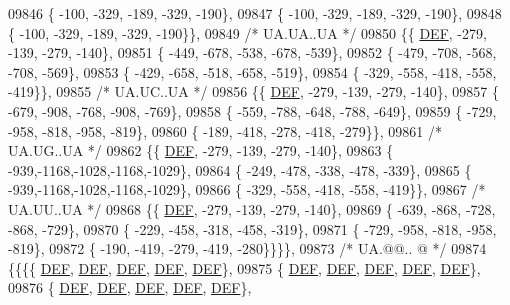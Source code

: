 \begin{DoxyCode}
09846 \{ -100, -329, -189, -329, -190\},
09847 \{ -100, -329, -189, -329, -190\},
09848 \{ -100, -329, -189, -329, -190\}\},
09849 \textcolor{comment}{/* UA.UA..UA */}
09850 \{\{  \mbox{\hyperlink{1_88_84__epars_8h_a397419fc12b37ed479c8abb9d444d843}{DEF}}, -279, -139, -279, -140\},
09851 \{ -449, -678, -538, -678, -539\},
09852 \{ -479, -708, -568, -708, -569\},
09853 \{ -429, -658, -518, -658, -519\},
09854 \{ -329, -558, -418, -558, -419\}\},
09855 \textcolor{comment}{/* UA.UC..UA */}
09856 \{\{  \mbox{\hyperlink{1_88_84__epars_8h_a397419fc12b37ed479c8abb9d444d843}{DEF}}, -279, -139, -279, -140\},
09857 \{ -679, -908, -768, -908, -769\},
09858 \{ -559, -788, -648, -788, -649\},
09859 \{ -729, -958, -818, -958, -819\},
09860 \{ -189, -418, -278, -418, -279\}\},
09861 \textcolor{comment}{/* UA.UG..UA */}
09862 \{\{  \mbox{\hyperlink{1_88_84__epars_8h_a397419fc12b37ed479c8abb9d444d843}{DEF}}, -279, -139, -279, -140\},
09863 \{ -939,-1168,-1028,-1168,-1029\},
09864 \{ -249, -478, -338, -478, -339\},
09865 \{ -939,-1168,-1028,-1168,-1029\},
09866 \{ -329, -558, -418, -558, -419\}\},
09867 \textcolor{comment}{/* UA.UU..UA */}
09868 \{\{  \mbox{\hyperlink{1_88_84__epars_8h_a397419fc12b37ed479c8abb9d444d843}{DEF}}, -279, -139, -279, -140\},
09869 \{ -639, -868, -728, -868, -729\},
09870 \{ -229, -458, -318, -458, -319\},
09871 \{ -729, -958, -818, -958, -819\},
09872 \{ -190, -419, -279, -419, -280\}\}\}\},
09873 \textcolor{comment}{/* UA.@@.. @ */}
09874 \{\{\{\{  \mbox{\hyperlink{1_88_84__epars_8h_a397419fc12b37ed479c8abb9d444d843}{DEF}},  \mbox{\hyperlink{1_88_84__epars_8h_a397419fc12b37ed479c8abb9d444d843}{DEF}},  \mbox{\hyperlink{1_88_84__epars_8h_a397419fc12b37ed479c8abb9d444d843}{DEF}},  \mbox{\hyperlink{1_88_84__epars_8h_a397419fc12b37ed479c8abb9d444d843}{DEF}},  \mbox{\hyperlink{1_88_84__epars_8h_a397419fc12b37ed479c8abb9d444d843}{DEF}}\},
09875 \{  \mbox{\hyperlink{1_88_84__epars_8h_a397419fc12b37ed479c8abb9d444d843}{DEF}},  \mbox{\hyperlink{1_88_84__epars_8h_a397419fc12b37ed479c8abb9d444d843}{DEF}},  \mbox{\hyperlink{1_88_84__epars_8h_a397419fc12b37ed479c8abb9d444d843}{DEF}},  \mbox{\hyperlink{1_88_84__epars_8h_a397419fc12b37ed479c8abb9d444d843}{DEF}},  \mbox{\hyperlink{1_88_84__epars_8h_a397419fc12b37ed479c8abb9d444d843}{DEF}}\},
09876 \{  \mbox{\hyperlink{1_88_84__epars_8h_a397419fc12b37ed479c8abb9d444d843}{DEF}},  \mbox{\hyperlink{1_88_84__epars_8h_a397419fc12b37ed479c8abb9d444d843}{DEF}},  \mbox{\hyperlink{1_88_84__epars_8h_a397419fc12b37ed479c8abb9d444d843}{DEF}},  \mbox{\hyperlink{1_88_84__epars_8h_a397419fc12b37ed479c8abb9d444d843}{DEF}},  \mbox{\hyperlink{1_88_84__epars_8h_a397419fc12b37ed479c8abb9d444d843}{DEF}}\},

\end{DoxyCode}
